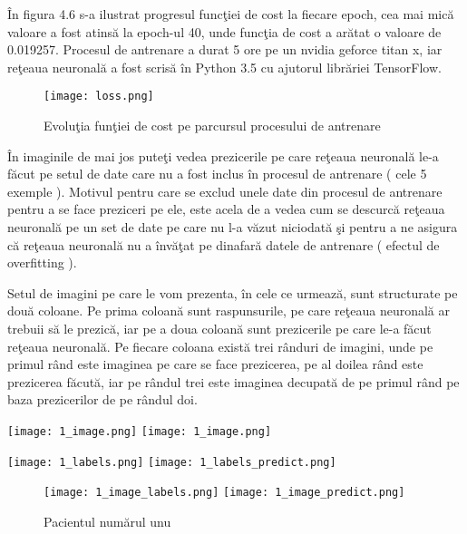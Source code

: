 \^{I}n figura 4.6 s-a ilustrat progresul func\c{t}iei de cost la fiecare epoch, cea mai mic\u{a} valoare a fost atins\u{a} la epoch-ul 40, unde func\c{t}ia de cost a ar\u{a}tat o valoare de 0.019257. Procesul de antrenare a durat 5 ore pe un nvidia geforce titan x, iar re\c{t}eaua neuronal\u{a} a fost scris\u{a} \^{i}n Python 3.5 cu ajutorul libr\u{a}riei TensorFlow.

\newpage

\begin{figure}[h!]
  \center
  \texttt{[image: loss.png]}
  \caption{Evolu\c{t}ia fun\c{t}iei de cost pe parcursul procesului de antrenare}
\end{figure}

\^{I}n imaginile de mai jos pute\c{t}i vedea prezicerile pe care re\c{t}eaua neuronal\u{a} le-a f\u{a}cut pe setul de date care nu a fost inclus \^{i}n procesul de antrenare ( cele 5 exemple ). Motivul pentru care se exclud unele date din procesul de antrenare pentru a se face preziceri pe ele, este acela de a vedea cum se descurc\u{a} re\c{t}eaua neuronal\u{a} pe un set de date pe care nu l-a v\u{a}zut niciodat\u{a} \c{s}i pentru a ne asigura c\u{a} re\c{t}eaua neuronal\u{a} nu a \^{i}nv\u{a}\c{t}at pe dinafar\u{a} datele de antrenare ( efectul de overfitting ).

\par

Setul de imagini pe care le vom prezenta, \^{i}n cele ce urmeaz\u{a}, sunt structurate pe dou\u{a} coloane. Pe prima coloan\u{a} sunt raspunsurile, pe care re\c{t}eaua neuronal\u{a} ar trebuii s\u{a} le prezic\u{a}, iar pe a doua coloan\u{a} sunt prezicerile pe care le-a f\u{a}cut re\c{t}eaua neuronal\u{a}. Pe fiecare coloana exist\u{a} trei r\^{a}nduri de imagini, unde pe primul r\^{a}nd este imaginea pe care se face prezicerea, pe al doilea r\^{a}nd este prezicerea f\u{a}cut\u{a}, iar pe r\^{a}ndul trei este imaginea decupat\u{a} de pe primul r\^{a}nd pe baza prezicerilor de pe r\^{a}ndul doi.

\begin{center}
\texttt{[image: 1\_image.png]}
\texttt{[image: 1\_image.png]}
\end{center}

\begin{center}
\texttt{[image: 1\_labels.png]}
\texttt{[image: 1\_labels\_predict.png]}
\end{center}

\begin{figure}[h!]
  \center
  \texttt{[image: 1\_image\_labels.png]}
\texttt{[image: 1\_image\_predict.png]}
  \caption{Pacientul num\u{a}rul unu}
\end{figure}

